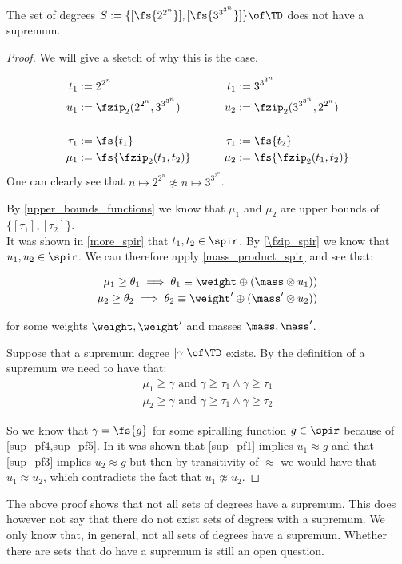 \begin{theorem}
	The set of degrees $S := \{[\fs{2^{2^{n}}}],[\fs{3^{3^{3^n}}}]\}\of\TD$ does not have a supremum.
	\begin{proof}
		
We will give a sketch of why this is the case.

\begin{align}
	t_1 &:= 2^{2^{n}} & \qquad t_1 &:= 3^{3^{3^n}} \\
	u_1 &:= \fzip_2(2^{2^{n}},3^{3^{3^n}}) & \qquad u_2 &:= \fzip_2(3^{3^{3^n}},2^{2^{n}}) \\ \nonumber \\
	\tau_1 &:= \fs{t_1} & \qquad\tau_1 &:= \fs{t_2} \\
	\mu_1 &:= \fs{\fzip_2(t_1,t_2)} & \qquad \mu_2 &:= \fs{\fzip_2(t_1,t_2)}
\end{align}
One can clearly see that $n\mapsto 2^{2^{n}} \not\approx n \mapsto 3^{3^{3^n}}$.

By \cref{upper_bounds_functions} we know that $\mu_1$ and $\mu_2$ are upper bounds of $\{[\tau_1],[\tau_2]\}$.  \\

It was shown in \cref{more_spir} that $t_1,t_2\in\spir$. By \cref{\fzip_spir} we know that $u_1,u_2\in\spir$. We can therefore apply \cref{mass_product_spir} and see that:

\begin{align}
	\mu_1 \geq \theta_1 \implies \theta_1 \equiv \weight \oplus (\mass \otimes u_1)) \label{sup_pf4}\\ 
	\mu_2 \geq \theta_2 \implies \theta_2 \equiv \weight' \oplus (\mass' \otimes u_2)) \label{sup_pf5}
\end{align}

for some weights $\weight,\weight'$ and masses $\mass,\mass'$.

Suppose that a supremum degree $[\gamma]\of\TD$ exists.
By the definition of a supremum we need to have that:
\begin{align}
	\mu_1\geq\gamma \text{ and }\gamma\geq\tau_1\land\gamma\geq\tau_1 \label{sup_pf1}\\
	\mu_2\geq\gamma \text{ and }\gamma\geq\tau_1\land\gamma\geq\tau_2 \label{sup_pf3}
\end{align}

So we know that $\gamma = \fs{g}$ for some spiralling function $g\in\spir$ because of \cref{sup_pf4,sup_pf5}. In \cite{streams:degrees:suprema:2020} it was shown that \cref{sup_pf1} implies $u_1 \approx g$ and that \cref{sup_pf3} implies $u_2 \approx g$ but then by transitivity of $\approx$ we would have that $u_1 \approx u_2$, which contradicts the fact that $u_1 \not\approx u_2$.

\end{proof}
\end{theorem}

The above proof shows that not all sets of degrees have a supremum. This does however not say that there do not exist sets of degrees with a supremum. We only know that, in general, not all sets of degrees have a supremum. Whether there are sets that do have a supremum is still an open question.